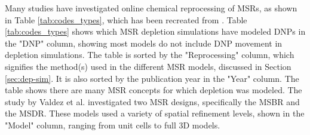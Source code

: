 Many studies have investigated online chemical reprocessing of \glspl{MSR}, as shown in Table \ref{tab:codes_types}, which has been recreated from \cite{seifert2023analysis}.
Table \ref{tab:codes_types} shows which \gls{MSR} depletion simulations have modeled \glspl{DNP} in the "DNP" column, showing most models do not include \gls{DNP} movement in depletion simulations.
The table is sorted by the "Reprocessing" column, which signifies the method(s) used in the different \gls{MSR} models, discussed in Section \ref{sec:dep-sim}.
It is also sorted by the publication year in the "Year" column.
The table shows there are many \gls{MSR} concepts for which depletion was modeled.
The study by Valdez et al. investigated two \gls{MSR} designs, specifically the \gls{MSBR} and the \gls{MSDR}.
These models used a variety of spatial refinement levels, shown in the "Model" column, ranging from unit cells to full 3D models.

